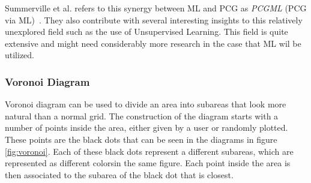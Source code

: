 Summerville et al. refers to this synergy between ML and PCG as \textit{PCGML} (PCG via ML)~\cite{lmao_ml}.
They also contribute with several interesting insights to this relatively unexplored field such as the use of Unsupervised Learning.
This field is quite extensive and might need considerably more research in the case that ML wil be utilized.

\subsubsection{Voronoi Diagram}
Voronoi diagram can be used to divide an area into subareas that look more natural than a normal grid. 
The construction of the diagram starts with a number of points inside the area, either given by a user or randomly plotted. 
These points are the black dots that can be seen in the diagrams in figure \ref{fig:voronoi}.
Each of these black dots represent a different subareas, which are represented as different colorsin the same figure.
Each point inside the area is then associated to the subarea of the black dot that is closest.

